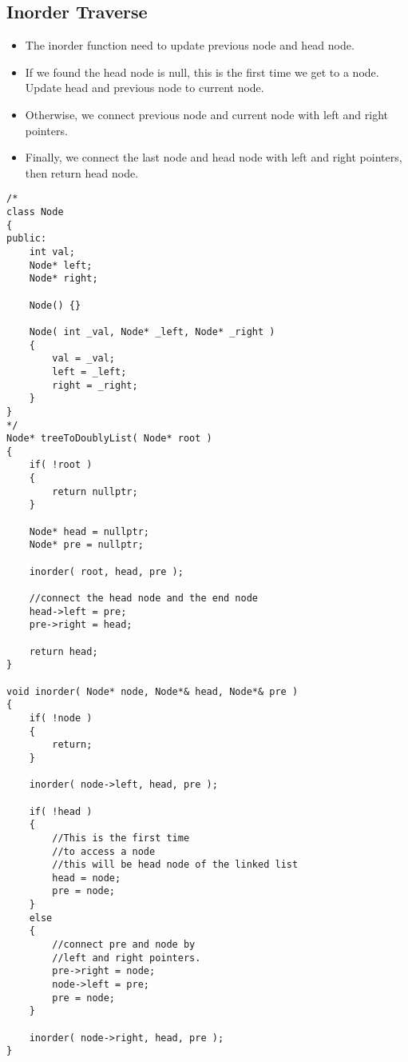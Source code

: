 \subsection{Inorder Traverse}
\begin{itemize}
\item The inorder function need to update previous node and head node.
\item If we found the head node is null, this is the first time we get to a node. Update head and previous node to current node.
\item Otherwise, we connect previous node and current node with left and right pointers.
\item Finally, we connect the last node and head node with left and right pointers, then return head node.
\end{itemize}

\setcounter{lstlisting}{0}
\begin{lstlisting}[style=customc, caption={Inorder Traverse}]
/*
class Node
{
public:
    int val;
    Node* left;
    Node* right;

    Node() {}

    Node( int _val, Node* _left, Node* _right )
    {
        val = _val;
        left = _left;
        right = _right;
    }
}
*/
Node* treeToDoublyList( Node* root )
{
    if( !root )
    {
        return nullptr;
    }

    Node* head = nullptr;
    Node* pre = nullptr;

    inorder( root, head, pre );

    //connect the head node and the end node
    head->left = pre;
    pre->right = head;

    return head;
}

void inorder( Node* node, Node*& head, Node*& pre )
{
    if( !node )
    {
        return;
    }

    inorder( node->left, head, pre );

    if( !head )
    {
        //This is the first time
        //to access a node
        //this will be head node of the linked list
        head = node;
        pre = node;
    }
    else
    {
        //connect pre and node by
        //left and right pointers.
        pre->right = node;
        node->left = pre;
        pre = node;
    }

    inorder( node->right, head, pre );
}


\end{lstlisting}
